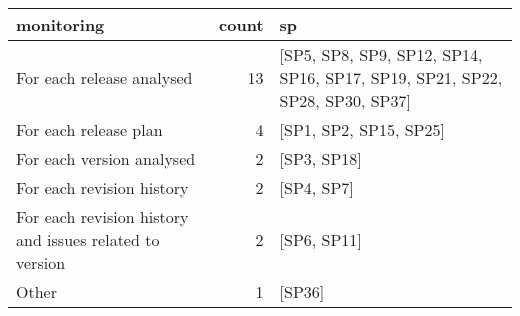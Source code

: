 \begin{tabular}{lrl}
\toprule
                                              monitoring &  count &                                                                           sp \\
\midrule
                               For each release analysed &     13 &  [SP5, SP8, SP9, SP12, SP14, SP16, SP17, SP19, SP21, SP22, SP28, SP30, SP37] \\
                                   For each release plan &      4 &                                                       [SP1, SP2, SP15, SP25] \\
                               For each version analysed &      2 &                                                                  [SP3, SP18] \\
                               For each revision history &      2 &                                                                   [SP4, SP7] \\
 For each revision history and issues related to version &      2 &                                                                  [SP6, SP11] \\
                                                   Other &      1 &                                                                       [SP36] \\
\bottomrule
\end{tabular}
